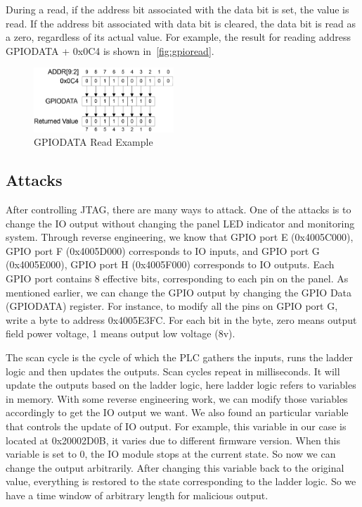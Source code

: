 During a read, if the address bit associated with the data bit is set, the value is read. If the address bit associated with data bit is cleared, the data bit is read as a zero, regardless of its actual value. For example, the result for reading address GPIODATA + 0x0C4 is shown in~\autoref{fig:gpioread}.

\begin{figure}[th]
	\includegraphics[width=0.47\textwidth]{figures/gpioread}
	\centering
	\caption{GPIODATA Read Example~\cite{lm3s2793}}
	\label{fig:gpioread}
\end{figure}



\subsection{Attacks}
After controlling JTAG, there are many ways to attack. One of the attacks is to change the IO output without changing the panel LED indicator and monitoring system. Through reverse engineering, we know that GPIO port E (0x4005C000), GPIO port F (0x4005D000) corresponds to IO inputs, and GPIO port G (0x4005E000), GPIO port H (0x4005F000) corresponds to IO outputs. Each GPIO port contains 8 effective bits, corresponding to each pin on the panel. As mentioned earlier, we can change the GPIO output by changing the GPIO Data (GPIODATA) register. For instance, to modify all the pins on GPIO port G, write a byte to address 0x4005E3FC. For each bit in the byte, zero means output field power voltage, 1 means output low voltage (8v).

The scan cycle is the cycle of which the PLC gathers the inputs, runs the ladder logic and then updates the outputs. Scan cycles repeat in milliseconds. It will update the outputs based on the ladder logic, here ladder logic refers to variables in memory. With some reverse engineering work, we can modify those variables accordingly to get the IO output we want. We also found an particular variable that controls the update of IO output. For example, this variable in our case is located at 0x20002D0B, it varies due to different firmware version. When this variable is set to 0, the IO module stops at the current state. So now we can change the output arbitrarily. After changing this variable back to the original value, everything is restored to the state corresponding to the ladder logic. So we have a time window of arbitrary length for malicious output. 



